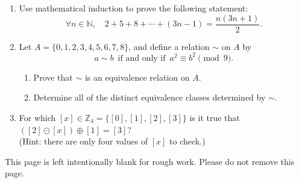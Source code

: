\documentclass[12pt]{article}
\newcommand{\points}[1]{\marginpar{\hspace{24pt}[#1]}}
\newcommand{\N}{\mathbb{N}}
\newcommand{\Z}{\mathbb{Z}}
\begin{document}
\begin{enumerate}
\newpage

\item Use mathematical induction to prove the following statement: \points{10}
\[
\forall n\in\N,\quad 2+5+8+\cdots + (3n-1) = \frac{n(3n+1)}{2}.
\]


\newpage

\item Let $A=\{0,1,2,3,4,5,6,7,8\}$, and define a relation $\sim$ on $A$ by 
\[
 a\sim b \, \text{ if and only if } \, a^2\equiv b^2 \pmod{9}.
\]
\begin{enumerate}
 \item Prove that $\sim$ is an equivalence relation on $A$. \points{5}

\vspace{3in}

 \item Determine all of the distinct equivalence classes determined by $\sim$.\points{3}

\vspace{2in}
\end{enumerate}
\item For which $[x]\in\Z_4 = \{[0],[1],[2],[3]\}$ is it true that $([2]\odot[x])\oplus [1] = [3]$?\points{2}\\
(Hint: there are only four values of $[x]$ to check.)

\end{enumerate}
\newpage

This page is left intentionally blank for rough work. Please do not remove this page.
\end{document}
